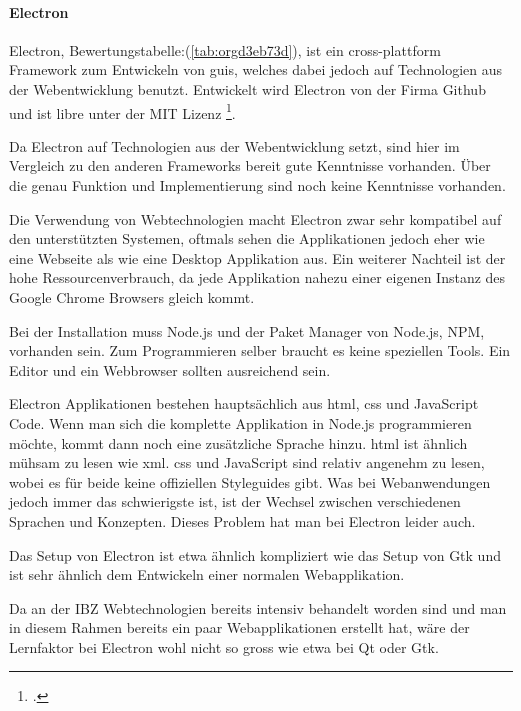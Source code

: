 \newpage
\paragraph{Electron}
\label{sec:org408db76}

Electron, Bewertungstabelle:(\ref{tab:orgd3eb73d}), ist ein cross-plattform Framework zum Entwickeln von \glspl{gui}, welches
dabei jedoch auf Technologien aus der Webentwicklung benutzt. Entwickelt wird
Electron von der Firma Github und ist \gls{libre} unter der MIT Lizenz
\footcite{electronlicense}.

Da Electron auf Technologien aus der Webentwicklung setzt, sind hier im
Vergleich zu den anderen Frameworks bereit gute Kenntnisse vorhanden. Über die
genau Funktion und Implementierung sind noch keine Kenntnisse vorhanden.

Die Verwendung von Webtechnologien macht Electron zwar sehr kompatibel auf den
unterstützten Systemen, oftmals sehen die Applikationen jedoch eher wie
eine Webseite als wie eine Desktop Applikation aus. Ein weiterer Nachteil ist
der hohe Ressourcenverbrauch, da jede Applikation nahezu einer eigenen Instanz
des Google Chrome Browsers gleich kommt.

Bei der Installation muss Node.js und der Paket Manager von Node.js, NPM,
vorhanden sein. Zum Programmieren selber braucht es keine speziellen Tools. Ein
Editor und ein Webbrowser sollten ausreichend sein.

Electron Applikationen bestehen hauptsächlich aus \gls{html}, \gls{css} und JavaScript
Code. Wenn man sich die komplette Applikation in Node.js programmieren möchte,
kommt dann noch eine zusätzliche Sprache hinzu. \gls{html} ist ähnlich mühsam zu
lesen wie \gls{xml}. \gls{css} und JavaScript sind relativ angenehm zu lesen, wobei es für
beide keine offiziellen Styleguides gibt. Was bei Webanwendungen jedoch immer
das schwierigste ist, ist der Wechsel zwischen verschiedenen Sprachen und
Konzepten. Dieses Problem hat man bei Electron leider auch.

Das Setup von Electron ist etwa ähnlich kompliziert wie das Setup von Gtk und
ist sehr ähnlich dem Entwickeln einer normalen Webapplikation.

Da an der IBZ Webtechnologien bereits intensiv behandelt worden sind und man in
diesem Rahmen bereits ein paar Webapplikationen erstellt hat, wäre der
Lernfaktor bei Electron wohl nicht so gross wie etwa bei Qt oder Gtk.


